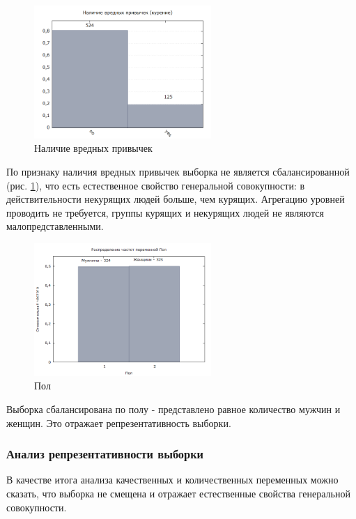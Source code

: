 \documentclass[a4paper,12pt]{article}
\begin{document}
\begin{figure}[H]
	\includegraphics[width=0.6\textwidth]{../[graphics]/smoker.png}
	\centering
	\caption{Наличие вредных привычек}
	\label{fig:smoker}
\end{figure}

По признаку наличия вредных привычек выборка не является сбалансированной (рис. \ref{fig:smoker}), что есть естественное свойство генеральной совокупности: в действительности некурящих людей больше, чем курящих. Агрегацию уровней проводить не требуется, группы курящих и некурящих людей не являются малопредставленными.

\begin{figure}[H]
	\includegraphics[width=0.6\textwidth]{../[graphics]/sex.png}
	\centering
	\caption{Пол}
	\label{fig:sex}
\end{figure}

Выборка сбалансирована по полу - представлено равное количество мужчин и женщин. Это отражает репрезентативность выборки.

\subsubsection{Анализ репрезентативности выборки}

В качестве итога анализа качественных и количественных переменных можно сказать, что выборка не смещена и отражает естественные свойства генеральной совокупности.
\end{document}
